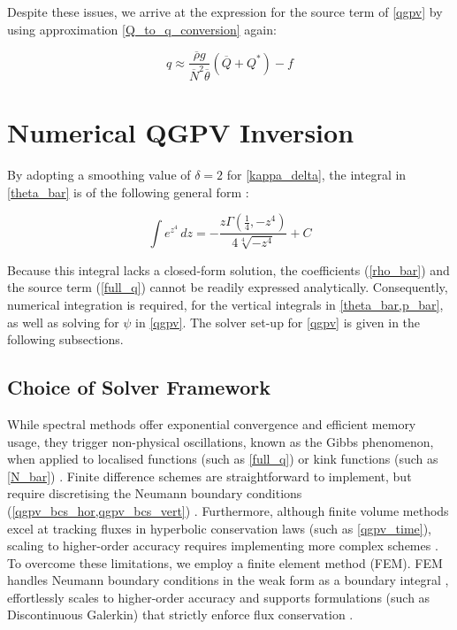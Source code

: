 \documentclass{article}
\begin{document}
Despite these issues, we arrive at the expression for the source term of \cref{qgpv} by using approximation \eqref{Q_to_q_conversion} again:

\begin{equation}\label{full_q}
    q \approx \frac{\overline{\rho} g}{\overline{N}^2 \overline{\theta}} \left(\overline Q + Q^*\right) - f
\end{equation}

\section{Numerical QGPV Inversion}\label{sec:numerical_soln}

By adopting a smoothing value of $\delta = 2$ for \cref{kappa_delta}, the integral in \cref{theta_bar} is of the following general form \cite{Mathematica}:

\begin{equation}\label{nonelementary_integral}
    \int e^{z^4}\,dz = - \frac{z \Gamma \left( \frac{1}{4}, -z^4\right)}{4 \sqrt[4]{-z^4}} + C 
\end{equation}

Because this integral lacks a closed-form solution, the coefficients (\cref{rho_bar}) and the source term (\cref{full_q}) cannot be readily expressed analytically.
Consequently, numerical integration is required, for the vertical integrals in \cref{theta_bar,p_bar}, as well as solving for $\psi$ in \cref{qgpv}.
The solver set-up for \cref{qgpv} is given in the following subsections.

\subsection{Choice of Solver Framework}

While spectral methods offer exponential convergence and efficient memory usage, they trigger non-physical oscillations, known as the Gibbs phenomenon, when applied to localised functions (such as \cref{full_q}) or kink functions (such as \cref{N_bar}) \cite{Trefethen2000}.
Finite difference schemes are straightforward to implement, but require discretising the Neumann boundary conditions (\cref{qgpv_bcs_hor,qgpv_bcs_vert}) \cite{fehlmann1997pvelements}.
Furthermore, although finite volume methods excel at tracking fluxes in hyperbolic conservation laws (such as \cref{qgpv_time}), scaling to higher-order accuracy requires implementing more complex schemes \cite{Durran2010}.
To overcome these limitations, we employ a finite element method (FEM).
FEM handles Neumann boundary conditions in the weak form as a boundary integral \cite{Segal2011femns}, effortlessly scales to higher-order accuracy and supports formulations (such as Discontinuous Galerkin) that strictly enforce flux conservation \cite{FiredrakeUserManual}.
\end{document}
